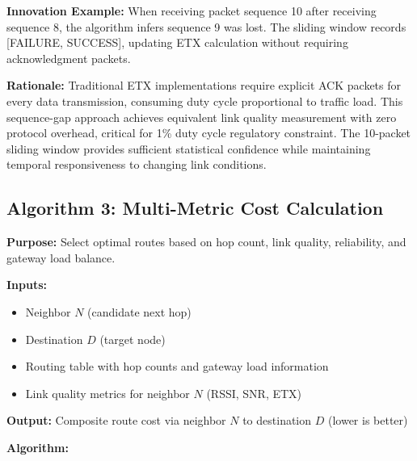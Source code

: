 \textbf{Innovation Example:} When receiving packet sequence 10 after receiving sequence 8, the algorithm infers sequence 9 was lost. The sliding window records [FAILURE, SUCCESS], updating ETX calculation without requiring acknowledgment packets.

\textbf{Rationale:} Traditional ETX implementations require explicit ACK packets for every data transmission, consuming duty cycle proportional to traffic load. This sequence-gap approach achieves equivalent link quality measurement with zero protocol overhead, critical for 1\% duty cycle regulatory constraint. The 10-packet sliding window provides sufficient statistical confidence while maintaining temporal responsiveness to changing link conditions.

\subsection{Algorithm 3: Multi-Metric Cost Calculation}

\textbf{Purpose:} Select optimal routes based on hop count, link quality, reliability, and gateway load balance.

\textbf{Inputs:}
\begin{itemize}
\item Neighbor $N$ (candidate next hop)
\item Destination $D$ (target node)
\item Routing table with hop counts and gateway load information
\item Link quality metrics for neighbor $N$ (RSSI, SNR, ETX)
\end{itemize}

\textbf{Output:} Composite route cost via neighbor $N$ to destination $D$ (lower is better)

\textbf{Algorithm:}

